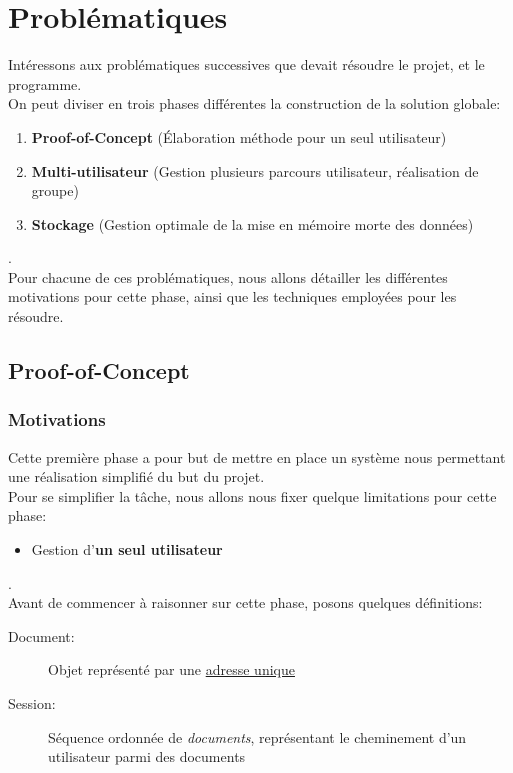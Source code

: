 \chapter{Problématiques}
    Intéressons aux problématiques successives que devait résoudre le projet, et le programme.\\

    On peut diviser en trois phases différentes la construction de la solution globale:
    \begin{enumerate}
        \item \textbf{Proof-of-Concept} (Élaboration méthode pour un seul utilisateur)
        \item \textbf{Multi-utilisateur} (Gestion plusieurs parcours utilisateur, réalisation de groupe)
        \item \textbf{Stockage} (Gestion optimale de la mise en mémoire morte des données)
    \end{enumerate}.\\

    Pour chacune de ces problématiques, nous allons détailler les différentes motivations pour cette phase, ainsi que les techniques employées pour les résoudre.

    \section{Proof-of-Concept}
        \subsection{Motivations}
            Cette première phase a pour but de mettre en place un système nous permettant une réalisation simplifié du but du projet.\\
            Pour se simplifier la tâche, nous allons nous fixer quelque limitations pour cette phase:
            \begin{itemize}
                \item Gestion d'\textbf{un seul utilisateur}
            \end{itemize}.\\

            Avant de commencer à raisonner sur cette phase, posons quelques définitions:
            \begin{description}
                \item[Document:] Objet représenté par une \underline{adresse unique}
                \item[Session:] Séquence ordonnée de \textit{documents}, représentant le cheminement d'un utilisateur parmi des documents
            \end{description}
            
